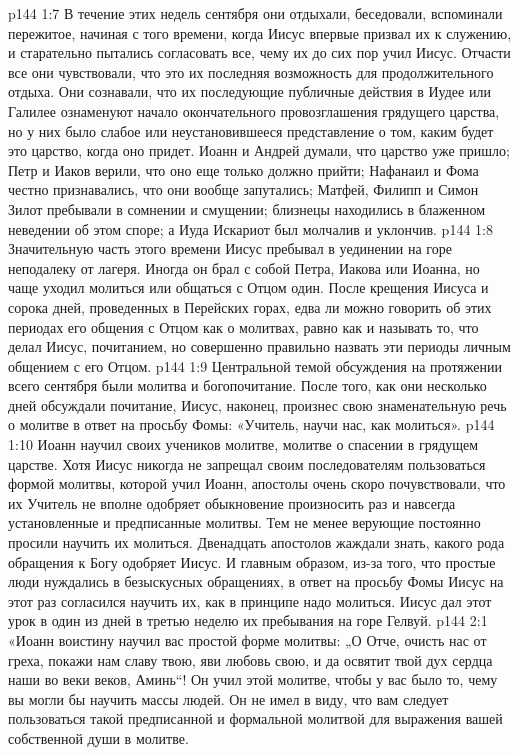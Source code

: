 \vs p144 1:7 В течение этих недель сентября они отдыхали, беседовали, вспоминали пережитое, начиная с того времени, когда Иисус впервые призвал их к служению, и старательно пытались согласовать все, чему их до сих пор учил Иисус. Отчасти все они чувствовали, что это их последняя возможность для продолжительного отдыха. Они сознавали, что их последующие публичные действия в Иудее или Галилее ознаменуют начало окончательного провозглашения грядущего царства, но у них было слабое или неустановившееся представление о том, каким будет это царство, когда оно придет. Иоанн и Андрей думали, что царство уже пришло; Петр и Иаков верили, что оно еще только должно прийти; Нафанаил и Фома честно признавались, что они вообще запутались; Матфей, Филипп и Симон Зилот пребывали в сомнении и смущении; близнецы находились в блаженном неведении об этом споре; а Иуда Искариот был молчалив и уклончив.
\vs p144 1:8 Значительную часть этого времени Иисус пребывал в уединении на горе неподалеку от лагеря. Иногда он брал с собой Петра, Иакова или Иоанна, но чаще уходил молиться или общаться с Отцом один. После крещения Иисуса и сорока дней, проведенных в Перейских горах, едва ли можно говорить об этих периодах его общения с Отцом как о молитвах, равно как и называть то, что делал Иисус, почитанием, но совершенно правильно назвать эти периоды личным общением с его Отцом.
\vs p144 1:9 Центральной темой обсуждения на протяжении всего сентября были молитва и богопочитание. После того, как они несколько дней обсуждали почитание, Иисус, наконец, произнес свою знаменательную речь о молитве в ответ на просьбу Фомы: «Учитель, научи нас, как молиться».
\vs p144 1:10 Иоанн научил своих учеников молитве, молитве о спасении в грядущем царстве. Хотя Иисус никогда не запрещал своим последователям пользоваться формой молитвы, которой учил Иоанн, апостолы очень скоро почувствовали, что их Учитель не вполне одобряет обыкновение произносить раз и навсегда установленные и предписанные молитвы. Тем не менее верующие постоянно просили научить их молиться. Двенадцать апостолов жаждали знать, какого рода обращения к Богу одобряет Иисус. И главным образом, из\hyp{}за того, что простые люди нуждались в безыскусных обращениях, в ответ на просьбу Фомы Иисус на этот раз согласился научить их, как в принципе надо молиться. Иисус дал этот урок в один из дней в третью неделю их пребывания на горе Гелвуй.
\vs p144 2:1 «Иоанн воистину научил вас простой форме молитвы: „О Отче, очисть нас от греха, покажи нам славу твою, яви любовь свою, и да освятит твой дух сердца наши во веки веков, Аминь“! Он учил этой молитве, чтобы у вас было то, чему вы могли бы научить массы людей. Он не имел в виду, что вам следует пользоваться такой предписанной и формальной молитвой для выражения вашей собственной души в молитве.
